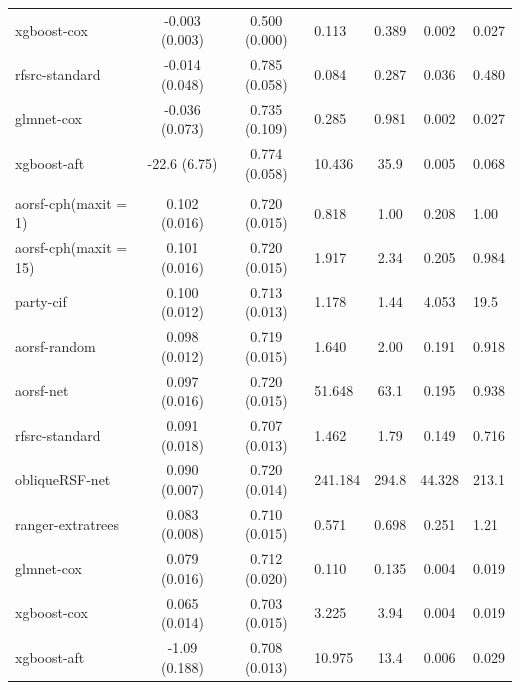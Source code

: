 \documentclass[twoside,11pt]{article}\usepackage[]{graphicx}\usepackage[]{color}
\newenvironment{knitrout}{}{} %
\begin{document}
\begin{knitrout}
\begin{longtable}{lcclccl}
\hspace{1em}xgboost-cox & -0.003 (0.003) & 0.500 (0.000) & 0.113 & 0.389 & 0.002 & 0.027\\
\hspace{1em}rfsrc-standard & -0.014 (0.048) & 0.785 (0.058) & 0.084 & 0.287 & 0.036 & 0.480\\
\hspace{1em}glmnet-cox & -0.036 (0.073) & 0.735 (0.109) & 0.285 & 0.981 & 0.002 & 0.027\\
\hspace{1em}xgboost-aft & -22.6 (6.75) & 0.774 (0.058) & 10.436 & 35.9 & 0.005 & 0.068\\
\addlinespace[0.3em]
\hline
\multicolumn{7}{l}{\textit{\textbf{Colon cancer; death, n = 929, p = 12}}}\\
\hline
\hspace{1em}aorsf-cph(maxit = 1) & 0.102 (0.016) & 0.720 (0.015) & 0.818 & 1.00 & 0.208 & 1.00\\
\hspace{1em}aorsf-cph(maxit = 15) & 0.101 (0.016) & 0.720 (0.015) & 1.917 & 2.34 & 0.205 & 0.984\\
\hspace{1em}party-cif & 0.100 (0.012) & 0.713 (0.013) & 1.178 & 1.44 & 4.053 & 19.5\\
\hspace{1em}aorsf-random & 0.098 (0.012) & 0.719 (0.015) & 1.640 & 2.00 & 0.191 & 0.918\\
\hspace{1em}aorsf-net & 0.097 (0.016) & 0.720 (0.015) & 51.648 & 63.1 & 0.195 & 0.938\\
\hspace{1em}rfsrc-standard & 0.091 (0.018) & 0.707 (0.013) & 1.462 & 1.79 & 0.149 & 0.716\\
\hspace{1em}obliqueRSF-net & 0.090 (0.007) & 0.720 (0.014) & 241.184 & 294.8 & 44.328 & 213.1\\
\hspace{1em}ranger-extratrees & 0.083 (0.008) & 0.710 (0.015) & 0.571 & 0.698 & 0.251 & 1.21\\
\hspace{1em}glmnet-cox & 0.079 (0.016) & 0.712 (0.020) & 0.110 & 0.135 & 0.004 & 0.019\\
\hspace{1em}xgboost-cox & 0.065 (0.014) & 0.703 (0.015) & 3.225 & 3.94 & 0.004 & 0.019\\
\hspace{1em}xgboost-aft & -1.09 (0.188) & 0.708 (0.013) & 10.975 & 13.4 & 0.006 & 0.029\\

\end{longtable}
\end{knitrout}
\end{document}
